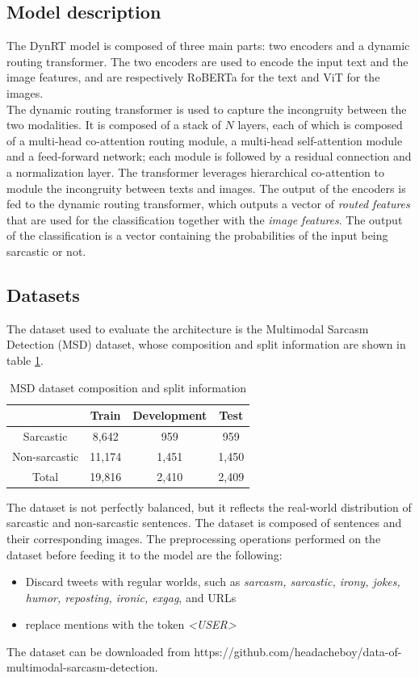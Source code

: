 \subsection{Model description}
The DynRT model is composed of three main parts: two encoders and a dynamic routing transformer. The two encoders are used to encode the input text and the image features, and are respectively RoBERTa \cite{RoBERTa} for the text and ViT \cite{ViT} for the images. \\
The dynamic routing transformer is used to capture the incongruity between the two modalities. It is composed of a stack of $N$ layers, each of which is composed of a multi-head co-attention routing module, a multi-head self-attention module and a feed-forward network; each module is followed by a residual connection and a normalization layer. The transformer leverages hierarchical co-attention to module the incongruity between texts and images. The output of the encoders is fed to the dynamic routing transformer, which outputs a vector of \textit{routed features} that are used for the classification together with the \textit{image features}. The output of the classification is a vector containing the probabilities of the input being sarcastic or not. 

\subsection{Datasets}
The dataset used to evaluate the architecture is the Multimodal Sarcasm Detection (MSD) dataset, whose composition and split information are shown in table \ref{tab:MSD}.
\begin{table}
    \caption{MSD dataset composition and split information}
    \label{tab:MSD}
    \centering
    \begin{tabular}{|c c c c|}
        \hline
         & \textbf{Train} & \textbf{Development} & \textbf{Test} \\
        \hline
        Sarcastic & 8,642 & 959 & 959 \\
        Non-sarcastic & 11,174 & 1,451 & 1,450 \\
        Total & 19,816 & 2,410 & 2,409 \\
        \hline
    \end{tabular}
\end{table}
The dataset is not perfectly balanced, but it reflects the real-world distribution of sarcastic and non-sarcastic sentences. The dataset is composed of sentences and their corresponding images. The preprocessing operations performed on the dataset before feeding it to the model are the following:
\begin{itemize}
    \item Discard tweets with regular worlds, such as \textit{sarcasm, sarcastic, irony, jokes, humor, reposting, ironic, exgag}, and URLs
    \item replace mentions with the token \textit{<USER>}
\end{itemize}
The dataset can be downloaded from https://github.com/headacheboy/data-of-multimodal-sarcasm-detection.



